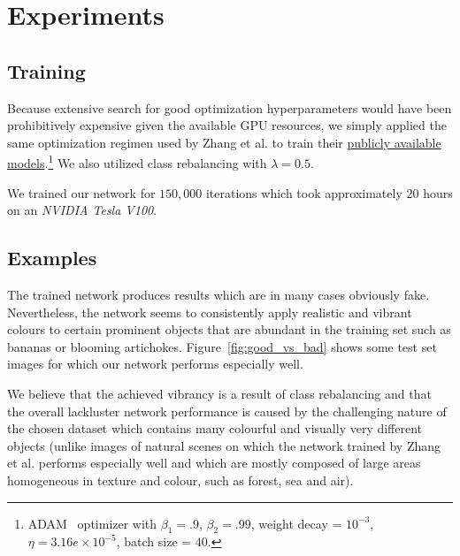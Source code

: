\documentclass{article}
\begin{document}
\section{Experiments}

\subsection{Training}

Because extensive search for good optimization hyperparameters would have been
prohibitively expensive given the available GPU resources, we simply applied
the same optimization regimen used by Zhang et al. to train their
\href{https://github.com/richzhang/colorization}{publicly available
models}.\footnote{ADAM~\cite{Adam} optimizer with $\beta_1 = .9$, $\beta_2 =
.99$, weight decay = $10^{-3}$, $\eta = 3.16e \times 10^{-5}$, batch size =
$40$.} We also utilized class rebalancing with $\lambda = 0.5$.

We trained our network for $150,000$ iterations which took approximately $20$
hours on an \textit{NVIDIA Tesla V100}.

\subsection{Examples}

The trained network produces results which are in many cases obviously fake.
Nevertheless, the network seems to consistently apply realistic and vibrant
colours to certain prominent objects that are abundant in the training set such
as bananas or blooming artichokes. Figure~\ref{fig:good_vs_bad} shows some test
set images for which our network performs especially well.

We believe that the achieved vibrancy is a result of class rebalancing and that
the overall lackluster network performance is caused by the challenging nature
of the chosen dataset which contains many colourful and visually very different
objects (unlike images of natural scenes on which the network trained by Zhang
et al. performs especially well and which are mostly composed of large areas
homogeneous in texture and colour, such as forest, sea and air).
\end{document}
